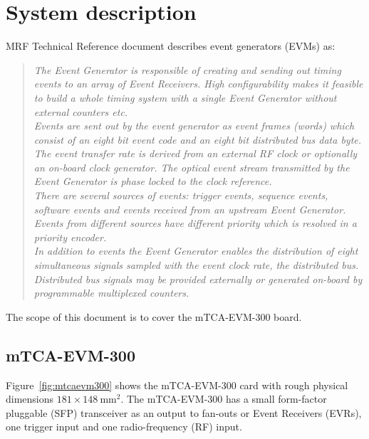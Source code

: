 \documentclass[11pt
  , a4paper
  , article
  , oneside
  , showtrims
]{memoir}
\begin{document}
\chapter{System description}
MRF Technical Reference document \citep[see][p12]{MRFEVENTGENERATOR} describes event generators (EVMs) as:
\blockquote{\textit{The Event Generator is responsible of creating and sending out timing events to an array of Event Receivers.
High configurability makes it feasible to build a whole timing system with a single Event Generator without external counters etc.\\
Events are sent out by the event generator as event frames (words) which consist of an eight bit event code and an eight bit distributed bus data byte. The event transfer rate is derived from an external RF clock or optionally an on-board clock generator. The optical event stream transmitted by the Event Generator is phase locked to the clock reference.\\
There are several sources of events: trigger events, sequence events, software events and events received from an upstream Event Generator. Events from different sources have different priority which is resolved in a priority encoder.\\
In addition to events the Event Generator enables the distribution of eight simultaneous signals sampled with the event clock rate, the distributed bus. Distributed bus signals may be provided externally or generated on-board by programmable multiplexed counters.}}

The scope of this document is to cover the mTCA-EVM-300 board.\\


\section{mTCA-EVM-300}
Figure~\ref{fig:mtcaevm300} shows the mTCA-EVM-300 card with rough physical dimensions $181\times 148~\mathrm{mm}{}^2$. The mTCA-EVM-300 has a small form-factor pluggable (SFP) transceiver as an output to fan-outs or Event Receivers (EVRs), one trigger input and one radio-frequency (RF) input.\\
\end{document}
